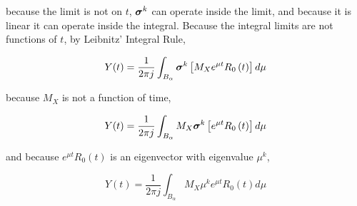	\noindent because the limit is not on $t$, $\boldsymbol{\sigma}^{k}$ can operate inside the limit, and because it is linear it can operate inside the integral. Because the integral limits are not functions of $t$, by Leibnitz' Integral Rule,

\begin{equation} Y(t) = \dfrac{1}{2\pi j}\int_{B_\alpha} \boldsymbol{\sigma}^{k} \left[ M_X  e^{\mu  t} R_0\left(t\right) \right] d\mu  \end{equation}

	\noindent because $M_X$ is not a function of time,

\begin{equation} Y(t) = \dfrac{1}{2\pi j}\int_{B_\alpha} M_X \boldsymbol{\sigma}^{k} \left[e^{\mu  t} R_0\left(t\right) \right] d\mu  \end{equation}

	\noindent and because $e^{\mu t}R_0(t)$ is an eigenvector with eigenvalue $\mu^k$,

\begin{equation} Y(t) = \dfrac{1}{2\pi j} \int_{B_\alpha} M_X \mu^k e^{\mu  t} R_0\left(t\right) d\mu  \end{equation}

